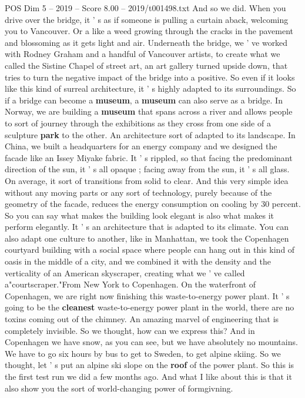 \begin{textsample}{POS Dim 5 – 2019 – Score 8.00 – 2019/t001498.txt}
And so we did.
When you drive over the bridge, it ' s as if someone is pulling a curtain aback, welcoming you to Vancouver.
Or a like a weed growing through the cracks in the pavement and blossoming as it gets light and air.
Underneath the bridge, we ' ve worked with Rodney Graham and a handful of Vancouver artists, to create what we called the Sistine Chapel of street art, an art gallery turned upside down, that tries to turn the negative impact of the bridge into a positive.
So even if it looks like this kind of surreal architecture, it ' s highly adapted to its surroundings.
So if a bridge can become a \textbf{museum}, a \textbf{museum} can also serve as a bridge.
In Norway, we are building a \textbf{museum} that spans across a river and allows people to sort of journey through the exhibitions as they cross from one side of a sculpture \textbf{park} to the other.
An architecture sort of adapted to its landscape.
In China, we built a headquarters for an energy company and we designed the facade like an Issey Miyake fabric.
It ' s rippled, so that facing the predominant direction of the sun, it ' s all opaque ; facing away from the sun, it ' s all glass.
On average, it sort of transitions from solid to clear.
And this very simple idea without any moving parts or any sort of technology, purely because of the geometry of the facade, reduces the energy consumption on cooling by 30 percent.
So you can say what makes the building look elegant is also what makes it perform elegantly.
It ' s an architecture that is adapted to its climate.
You can also adapt one culture to another, like in Manhattan, we took the Copenhagen courtyard building with a social space where people can hang out in this kind of oasis in the middle of a city, and we combined it with the density and the verticality of an American skyscraper, creating what we ' ve called a"courtscraper."From New York to Copenhagen.
On the waterfront of Copenhagen, we are right now finishing this waste-to-energy power plant.
It ' s going to be the \textbf{cleanest} waste-to-energy power plant in the world, there are no toxins coming out of the chimney.
An amazing marvel of engineering that is completely invisible.
So we thought, how can we express this?
And in Copenhagen we have snow, as you can see, but we have absolutely no mountains.
We have to go six hours by bus to get to Sweden, to get alpine skiing.
So we thought, let ' s put an alpine ski slope on the \textbf{roof} of the power plant.
So this is the first test run we did a few months ago.
And what I like about this is that it also show you the sort of world-changing power of formgivning.

\end{textsample}
